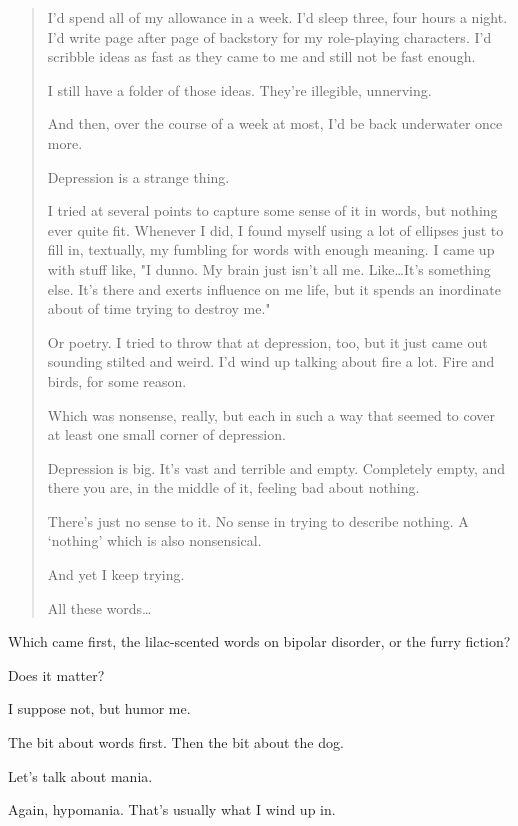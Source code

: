 \begin{quotation}
I'd spend all of my allowance in a week. I'd sleep three, four hours a night. I'd write page after page of backstory for my role-playing characters. I'd scribble ideas as fast as they came to me and still not be fast enough.

I still have a folder of those ideas. They're illegible, unnerving.

And then, over the course of a week at most, I'd be back underwater once more.

Depression is a strange thing.

I tried at several points to capture some sense of it in words, but nothing ever quite fit. Whenever I did, I found myself using a lot of ellipses just to fill in, textually, my fumbling for words with enough meaning. I came up with stuff like, "I dunno. My brain just isn't all me. Like\ldots{}It's something else. It's there and exerts influence on me life, but it spends an inordinate about of time trying to destroy me."

Or poetry. I tried to throw that at depression, too, but it just came out sounding stilted and weird. I'd wind up talking about fire a lot. Fire and birds, for some reason.

Which was nonsense, really, but each in such a way that seemed to cover at least one small corner of depression.

Depression is big. It's vast and terrible and empty. Completely empty, and there you are, in the middle of it, feeling bad about nothing.

There's just no sense to it. No sense in trying to describe nothing. A ‘nothing' which is also nonsensical.

And yet I keep trying.

All these words\ldots{}
\end{quotation}

\begin{ally}
Which came first, the lilac-scented words on bipolar disorder, or the furry fiction?
\end{ally}
Does it matter?

\begin{ally}
I suppose not, but humor me.
\end{ally}
The bit about words first. Then the bit about the dog.

\begin{ally}
Let's talk about mania.
\end{ally}
Again, hypomania. That's usually what I wind up in.

